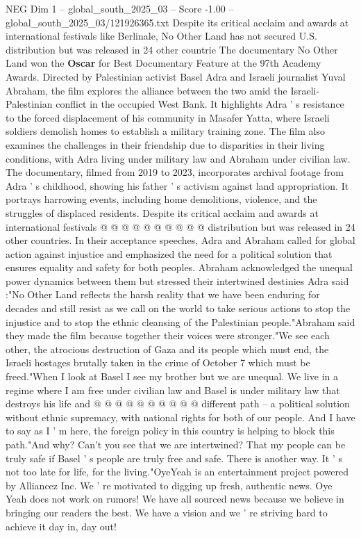 \begin{textsample}{NEG Dim 1 – global\_south\_2025\_03 – Score -1.00 – global\_south\_2025\_03/121926365.txt}  \label{ex:f1_neg_158}
Despite its critical acclaim and awards at international festivals like Berlinale, No Other Land has not secured U.S. distribution but was released in 24 other countrie The documentary No Other Land won the \textbf{Oscar} for Best Documentary Feature at the 97th Academy Awards.
Directed by Palestinian activist Basel Adra and Israeli journalist Yuval Abraham, the film explores the alliance between the two amid the Israeli-Palestinian conflict in the occupied West Bank.
It highlights Adra ' s resistance to the forced displacement of his community in Masafer Yatta, where Israeli soldiers demolish homes to establish a military training zone.
The film also examines the challenges in their friendship due to disparities in their living conditions, with Adra living under military law and Abraham under civilian law.
The documentary, filmed from 2019 to 2023, incorporates archival footage from Adra ' s childhood, showing his father ' s activism against land appropriation.
It portrays harrowing events, including home demolitions, violence, and the struggles of displaced residents.
Despite its critical acclaim and awards at international festivals @ @ @ @ @ @ @ @ @ @ distribution but was released in 24 other countries.
In their acceptance speeches, Adra and Abraham called for global action against injustice and emphasized the need for a political solution that ensures equality and safety for both peoples.
Abraham acknowledged the unequal power dynamics between them but stressed their intertwined destinies Adra said :"No Other Land reflects the harsh reality that we have been enduring for decades and still resist as we call on the world to take serious actions to stop the injustice and to stop the ethnic cleansing of the Palestinian people."Abraham said they made the film because together their voices were stronger."We see each other, the atrocious destruction of Gaza and its people which must end, the Israeli hostages brutally taken in the crime of October 7 which must be freed."When I look at Basel I see my brother but we are unequal.
We live in a regime where I am free under civilian law and Basel is under military law that destroys his life and @ @ @ @ @ @ @ @ @ @ different path -- a political solution without ethnic supremacy, with national rights for both of our people.
And I have to say as I ' m here, the foreign policy in this country is helping to block this path."And why?
Can't you see that we are intertwined?
That my people can be truly safe if Basel ' s people are truly free and safe.
There is another way.
It ' s not too late for life, for the living."OyeYeah is an entertainment project powered by Alliancez Inc.
We ' re motivated to digging up fresh, authentic news.
Oye Yeah does not work on rumors!
We have all sourced news because we believe in bringing our readers the best.
We have a vision and we ' re striving hard to achieve it day in, day out!

\end{textsample}
